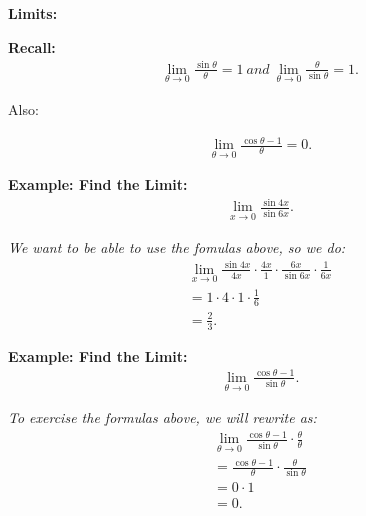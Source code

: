 \documentclass{report}
\begin{document}
  \bigbreak \noindent 
  \begin{large}
    \textbf{Limits:}
  \end{large}
  \begin{mdframed}
    \textbf{Recall:}
    \begin{align*}
      \lim_{\theta \to 0}{ \frac{ \sin{\theta}}{\theta}} = 1\ and\ \lim_{\theta \to 0}{ \frac{\theta}{ \sin{\theta}} = 1}
    .\end{align*}
    \begin{center}
      Also:
    \end{center}
    \begin{align*}
      \lim_{\theta \to 0}{ \frac{ \cos{\theta} - 1}{\theta}} = 0
    .\end{align*}
  \end{mdframed}
  \bigbreak \noindent 
  \begin{mdframed}
    \textbf{Example: Find the Limit:}
    \begin{align*}
      \lim_{x \to 0}{ \frac{ \sin{4x}}{ \sin{6x}}}  
    .\end{align*}
  \end{mdframed}
  \bigbreak \noindent 
  \textit{We want to be able to use the fomulas above, so we do:}
  \bigbreak \noindent 
  \begin{align*}
    \lim_{x \to 0}{ \frac{ \sin{4x}}{4x}} \cdot \frac{4x}{1} \cdot \frac{6x}{ \sin{6x}} \cdot \frac{1}{6x} \\
    = 1 \cdot 4 \cdot 1 \cdot \frac{1}{6} \\ 
    = \frac{2}{3}
  .\end{align*}

  \bigbreak \noindent 
  \begin{mdframed}
    \textbf{Example: Find the Limit:}
    \begin{align*}
      \lim_{\theta \to 0}{ \frac{ \cos{\theta} -1}{ \sin{\theta}}}
    .\end{align*}
  \end{mdframed}
  \bigbreak \noindent 
  \textit{To exercise the formulas above, we will rewrite as:}
  \begin{align*}
    \lim_{\theta \to 0}{ \frac{ \cos{\theta} - 1}{ \sin{\theta}}} \cdot \frac{\theta}{\theta} \\ 
    = \frac{ \cos{\theta} - 1}{\theta} \cdot \frac{\theta}{ \sin{\theta}} \\
    = 0 \cdot 1 \\
    = 0
  .\end{align*}
\end{document}
